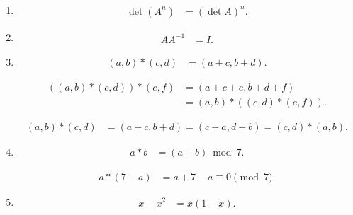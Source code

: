 \begin{enumerate}[label=\thesubsection.\arabic*, ref=\thesubsection.\theenumi, leftmargin=12mm, itemsep=4pt]
    \begin{align}
        \theta y-y &= xy'-y.
        \label{formula:C12-Q25-S01}
    \end{align}

    \setcounter{enumi}{6}
    \item[\ref{question-short:C12-Q28}]
    \begin{align}
        \det(A^n) &= (\det A)^n.
        \label{formula:C12-Q28}
    \end{align}

    \setcounter{enumi}{7}
    \item[\ref{question-short:C12-Q30}]
    \begin{align}
        AA^{-1} &= I.
        \label{formula:C12-Q30}
    \end{align}

    \setcounter{enumi}{10}
    \item[\ref{question-short:C12-Q50}]
    \begin{align}
        (a,b)*(c,d) &= (a+c,b+d).
        \label{formula:C12-Q50}
    \end{align}

    \begin{align}
        ((a,b)*(c,d))*(e,f) &= (a+c+e,b+d+f)\\
                            &= (a,b)*((c,d)*(e,f)).
        \label{formula:C12-Q50-F01}
    \end{align}

    \begin{align}
        (a,b)*(c,d) &= (a+c,b+d)=(c+a,d+b)=(c,d)*(a,b).
        \label{formula:C12-Q50-F02}
    \end{align}

    \setcounter{enumi}{11}
    \item[\ref{question-short:C12-Q51}]
    \begin{align}
        a*b &= (a+b)\bmod 7.
        \label{formula:C12-Q51}
    \end{align}

    \begin{align}
        a*(7-a) &= a+7-a\equiv0\pmod7.
        \label{formula:C12-Q51-F02}
    \end{align}

    \setcounter{enumi}{12}
    \item[\ref{question-short:C12-Q52}]
    \begin{align}
        x-x^2 &= x(1-x).
        \label{formula:C12-Q52}
    \end{align}


\end{enumerate}
